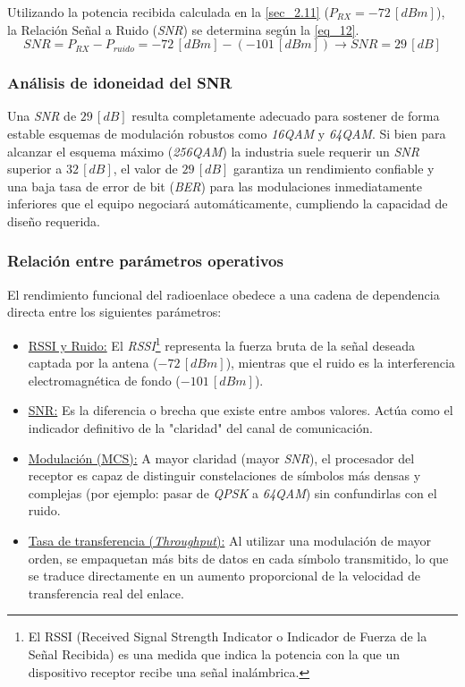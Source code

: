 Utilizando la potencia recibida calculada en la \autoref{sec_2.11} ($P_{RX} = -72 \, [dBm]$), la Relación Señal a Ruido (\textit{SNR}) se determina según la \autoref{eq_12}.
\begin{equation}
    SNR = P_{RX} - P_{ruido} = -72 \, [dBm] - (-101 \, [dBm]) \longrightarrow SNR = 29 \, [dB]
    \label{eq_12}
\end{equation}

\subsubsection{Análisis de idoneidad del SNR}
\label{sec_2.14.1}
Una \textit{SNR} de $29 \, [dB]$ resulta completamente adecuado para sostener de forma estable esquemas de modulación robustos como \textit{16QAM} y \textit{64QAM}. Si bien para alcanzar el esquema máximo (\textit{256QAM}) la industria suele requerir un \textit{SNR} superior a $32 \, [dB]$, el valor de $29 \, [dB]$ garantiza un rendimiento confiable y una baja tasa de error de bit (\textit{BER}) para las modulaciones inmediatamente inferiores que el equipo negociará automáticamente, cumpliendo la capacidad de diseño requerida.

\subsubsection{Relación entre parámetros operativos}
\label{sec_2.14.2}
El rendimiento funcional del radioenlace obedece a una cadena de dependencia directa entre los siguientes parámetros:
\begin{itemize}
    \item \underline{RSSI y Ruido:} El \textit{RSSI}\footnote{El RSSI (Received Signal Strength Indicator o Indicador de Fuerza de la Señal Recibida) es una medida que indica la potencia con la que un dispositivo receptor recibe una señal inalámbrica.} representa la fuerza bruta de la señal deseada captada por la antena ($-72 \, [dBm]$), mientras que el ruido es la interferencia electromagnética de fondo ($-101 \, [dBm]$).
    \item \underline{SNR:} Es la diferencia o brecha que existe entre ambos valores. Actúa como el indicador definitivo de la "claridad" del canal de comunicación.
    \item \underline{Modulación (MCS):} A mayor claridad (mayor \textit{SNR}), el procesador del receptor es capaz de distinguir constelaciones de símbolos más densas y complejas (por ejemplo: pasar de \textit{QPSK} a \textit{64QAM}) sin confundirlas con el ruido.
    \item \underline{Tasa de transferencia (\textit{Throughput}):} Al utilizar una modulación de mayor orden, se empaquetan más bits de datos en cada símbolo transmitido, lo que se traduce directamente en un aumento proporcional de la velocidad de transferencia real del enlace.
\end{itemize}



